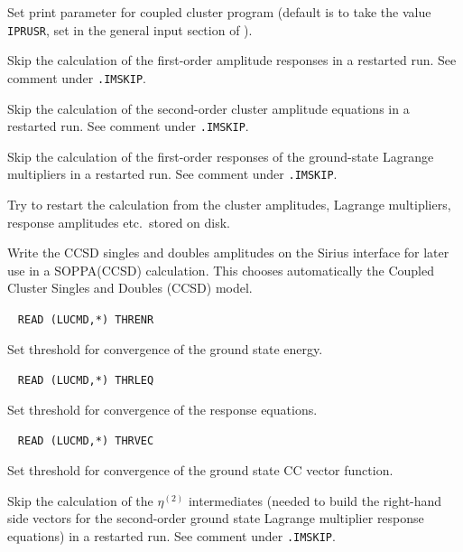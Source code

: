 \begin{description}
       Set print parameter for coupled cluster program
       (default is to take the value \verb+IPRUSR+, set in the general
       input section of \dalton).
%
\item[\Key{R1SKIP}] 
   Skip the calculation of the first-order amplitude responses
   in a restarted run. See comment under \verb|.IMSKIP|.
%
\item[\Key{R2SKIP}] 
   Skip the calculation of the 
   second-order cluster amplitude equations
   in a restarted run. See comment under \verb|.IMSKIP|.
%
\item[\Key{RESKIP}] 
   Skip the calculation of the first-order responses of the 
   ground-state Lagrange multipliers in a restarted run. See comment under \verb|.IMSKIP|.
%
\item[\Key{RESTART}] 
       Try to restart the calculation from the cluster amplitudes,
       Lagrange multipliers, response amplitudes etc.\ stored on
       disk.
%
\item[\Key{SOPPA(CCSD)}] 
       Write the CCSD singles and doubles amplitudes on the Sirius interface
       for later use in a SOPPA(CCSD) calculation. This
       chooses automatically the Coupled Cluster Singles and Doubles (CCSD) model.
%
\item[\Key{THRENR}] \verb| |\newline
       \verb|READ (LUCMD,*) THRENR|

       Set threshold for convergence of the ground state energy.
 
\item[\Key{THRLEQ}] \verb| |\newline
       \verb|READ (LUCMD,*) THRLEQ|

       Set threshold for convergence of the response equations.
 
\item[\Key{THRVEC}] \verb| |\newline
       \verb|READ (LUCMD,*) THRVEC|

       Set threshold for convergence of the ground state CC vector function.
 
%
%
\item[\Key{X2SKIP}] 
   Skip the calculation of the $\eta^{(2)}$ intermediates (needed
   to build the right-hand side vectors for the second-order 
   ground state Lagrange multiplier response equations) 
   in a restarted run. See comment under \verb|.IMSKIP|.
%
\end{description}

